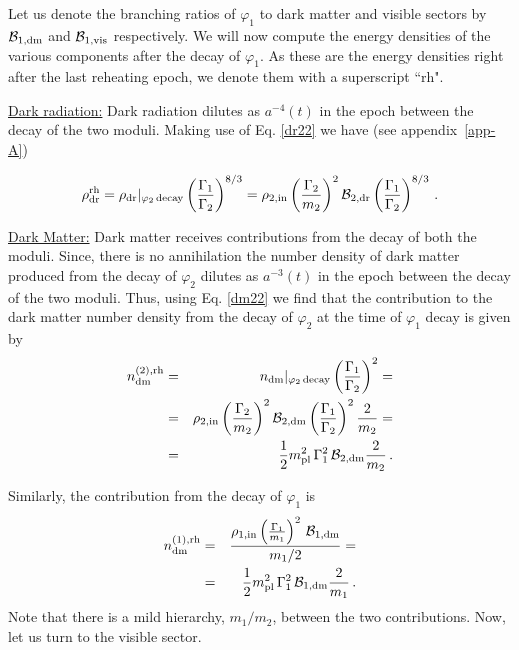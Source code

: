 \documentclass[12pt]{article}
\numberwithin{equation}{section}
\def\bea{\begin{eqnarray}}
\def\eea{\end{eqnarray}}
\def\bel#1{\begin{equation} \label{#1}}
\def\ee{\end{equation}}
\begin{document}
Let us denote the branching ratios of $\varphi_1$ to dark matter and visible sectors by ${\cal B}_{\rm 1,dm}$ and ${\cal B}_{\rm 1,vis}$ respectively.
We will now compute the energy densities of the various components after the decay of $\varphi_1$. As these are the energy densities
right after the last reheating epoch, we denote them with a superscript ${\textrm{{``rh"}}}$.



 \noindent \underline{Dark radiation:} Dark radiation dilutes as $a^{-4}(t)$ in the epoch between the decay of the two moduli. Making use of Eq. \eqref{dr22}
we have (see appendix~\ref{app-A})

%
\bel{drrh}
\rho_{\rm dr}^{\rm rh} = \rho_{\rm dr}|_ {\rm \varphi_2 \, decay} \left( \frac{\Gamma_1}{\Gamma_2} \right)^{8/3}  = 
\rho_{\rm 2, in} \left( \frac{\Gamma_2}{m_2} \right)^2  {\cal B}_{\rm 2,dr}    \left( \frac{\Gamma_1}{\Gamma_2} \right)^{8/3} \,. \\ 
\ee
%
%

\noindent \underline{Dark Matter:} Dark matter receives contributions from the decay of both the moduli. Since, there is no annihilation the
number density of dark matter produced from the decay of $\varphi_2$ dilutes as $a^{-3}(t)$ in the epoch between the decay of the two moduli.
Thus, using Eq. \eqref{dm22} we find that the contribution to the dark matter number density from the decay of $\varphi_2$ at the time of $\varphi_1$ decay is given by 
%
\bea
n_{\rm dm}^ {(2), \rm rh} &=&  n_{\rm dm}|_ {\rm \varphi_2 \, decay}  \left( \frac{\Gamma_1}{\Gamma_2} \right)^2 = \cr
&=& \rho_{\rm 2, in} \left( \frac{\Gamma_2}{m_2} \right)^2  {\cal B}_{\rm 2,dm}  \left( \frac{\Gamma_1}{\Gamma_2} \right)^2 \frac{2}{m_2} = \cr
&=&  \frac{1}{2} m_{\rm pl}^2 \, \Gamma_1^2  \, {\cal B}_{\rm 2,dm} \frac{2}{m_2} \,. \label{nDM2rh}
\eea
%


Similarly, the contribution from the decay of $\varphi_1$ is
% 
\bea
\label{dm-justify}
n_{\rm dm}^ {(1), \rm rh} &=&  \frac{\rho_{\rm 1, in}  \left( \frac{\Gamma_1}{m_1} \right)^2 \, {\cal B}_{\rm 1,dm} }{m_1/2} = \cr
&=&  \frac{1}{2} m_{\rm pl}^2 \, \Gamma_1^2  \, {\cal B}_{\rm 1,dm} \frac{2}{m_1} \,.
\eea
%
%
%
%
Note that there is a mild hierarchy, $m_1/m_2$, between the two contributions. 
Now, let us turn to the visible sector. 
\end{document}
